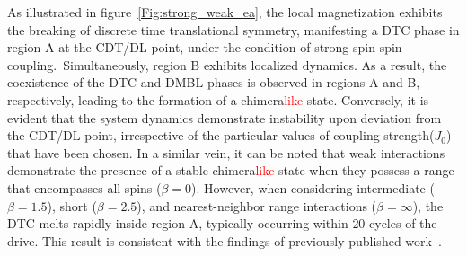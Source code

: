 \documentclass[12pt]{iopart}
\newcommand{\red}[1]{\textcolor{red}{#1}}
\begin{document}
As illustrated in figure~\ref{Fig:strong_weak_ea}, the local magnetization exhibits the breaking of discrete time translational symmetry, manifesting a DTC phase in region A at the CDT/DL point, under the condition of strong spin-spin coupling. Simultaneously, region B exhibits localized dynamics. As a result, the coexistence of the DTC and DMBL phases is observed in regions A and B, respectively, leading to the formation of a chimera\red{like} state. Conversely, it is evident that the system dynamics demonstrate instability upon deviation from the CDT/DL point, irrespective of the particular values of coupling strength($J_0$) that have been chosen. In a similar vein, it can be noted that weak interactions demonstrate the presence of a stable chimera\red{like} state when they possess a range that encompasses all spins ($\beta=0$). However, when considering intermediate ($\beta = 1.5$), short ($\beta = 2.5$), and nearest-neighbor range interactions ($\beta = \infty$), the DTC melts rapidly inside region A, typically occurring within $20$ cycles of the drive. This result is consistent with the findings of previously published work~\cite{sakurai_phys_nodate}.
	
\end{document}
